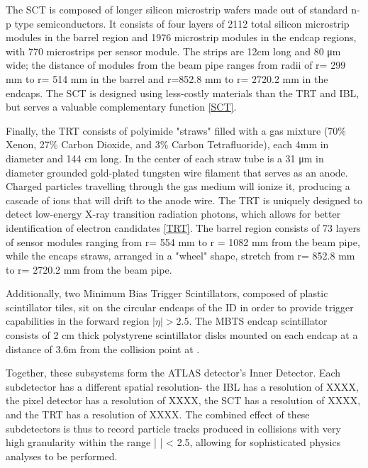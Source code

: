 The SCT is composed of longer silicon microstrip wafers made out of standard n-p type semiconductors. It consists of four layers of 2112 total silicon microstrip modules in the barrel region and 1976 microstrip modules in the endcap regions, with 770 microstrips per sensor module. The strips are 12cm long and 80 μm wide; the distance of modules from the beam pipe ranges from radii of r= 299 mm to r= 514 mm in the barrel and r=852.8 mm to r= 2720.2 mm in the endcaps. The SCT is designed using less-costly materials than the TRT and IBL, but serves a valuable complementary function \ref{SCT}.

Finally, the TRT consists of polyimide "straws" filled with a gas mixture (70\% Xenon, 27\% Carbon Dioxide, and 3\% Carbon Tetrafluoride), each 4mm in diameter and 144 cm long. In the center of each straw tube is a 31 μm in diameter grounded gold-plated tungsten wire filament that serves as an anode. Charged particles travelling through the gas medium will ionize it, producing a cascade of ions that will drift to the anode wire. The TRT is uniquely designed to detect low-energy X-ray transition radiation photons, which allows for better identification of electron candidates \ref{TRT}. The barrel region consists of 73 layers of sensor modules ranging from r= 554 mm to r = 1082 mm from the beam pipe, while the encaps straws, arranged in a "wheel" shape, stretch from r= 852.8 mm to r= 2720.2 mm from the beam pipe. 

Additionally, two Minimum Bias Trigger Scintillators, composed of plastic scintillator tiles, sit on the circular endcaps of the ID in order to provide trigger capabilities in the forward region \(|\eta| > 2.5 \). The MBTS endcap scintillator consists of 2 cm thick polystyrene scintillator disks mounted on each endcap at a distance of 3.6m from the collision point at . 

Together, these subsystems form the ATLAS detector's Inner Detector. Each subdetector has a different spatial resolution- the IBL has a resolution of XXXX, the pixel detector has a resolution of XXXX, the SCT has a resolution of XXXX, and the TRT has a resolution of XXXX. The combined effect of these subdetectors is thus to record particle tracks produced in collisions with very high granularity within the range | \eta | < 2.5, allowing for sophisticated physics analyses to be performed. 


